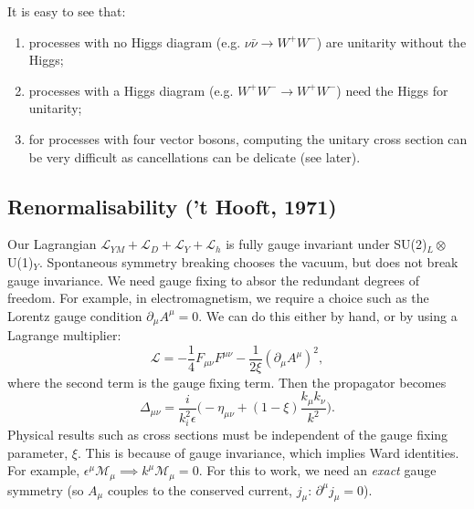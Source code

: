 It is easy to see that:
\begin{enumerate}
\item processes with no Higgs diagram (e.g. $\nu\bar{\nu} \to W^+ W^-$) are unitarity without the Higgs;
\item processes with a Higgs diagram (e.g. $W^+W^- \to W^+W^-$) need the Higgs for unitarity;
\item for processes with four vector bosons, computing the unitary cross section can be very difficult as cancellations can be delicate (see later).
\end{enumerate}
%
\subsection{Renormalisability ('t Hooft, 1971)}
% 
Our Lagrangian $\mathcal{L}_{YM} + \mathcal{L}_D + \mathcal{L}_Y + \mathcal{L}_h$ is fully gauge invariant under SU(2)$_L \otimes$U(1)$_Y$. Spontaneous symmetry breaking chooses the vacuum, but does not break gauge invariance. We need gauge fixing to absor the redundant degrees of freedom. For example, in electromagnetism, we require a choice such as the Lorentz gauge condition $\partial_\mu A^\mu = 0$. We can do this either by hand, or by using a Lagrange multiplier:
\begin{equation}
\mathcal{L} = - \frac{1}{4}F_{\mu \nu}F^{\mu \nu} - \frac{1}{2\xi}({\partial_\mu A^\mu})^2,
\end{equation}
where the second term is the gauge fixing term. Then the propagator becomes
\begin{equation}
\Delta_{\mu \nu} = \frac{i}{k^2 _ i\epsilon}\bigg(-\eta_{\mu \nu} + (1-\xi)\frac{k_\mu k_\nu}{k^2} \bigg).
\end{equation}
Physical results such as cross sections must be independent of the gauge fixing parameter, $\xi$. This is because of gauge invariance, which implies Ward identities. For example, $\epsilon^\mu \mathcal{M}_\mu \implies k^\mu \mathcal{M}_\mu = 0$. For this to work, we need an \textit{exact} gauge symmetry (so $A_\mu$ couples to the conserved current, $j_\mu$: $\partial^\mu j_\mu =0$).

